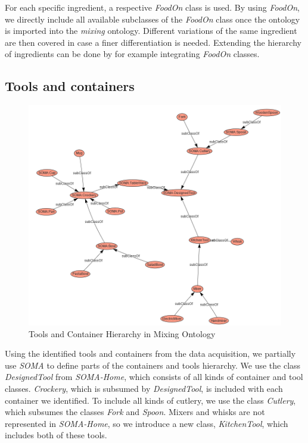 For each specific ingredient, a respective \textit{FoodOn}\cite{dooley2018foodon} class is used. By using \textit{FoodOn}, we directly include all available subclasses of the 
\textit{FoodOn} class once the ontology is imported into the \textit{mixing} ontology.
Different variations of the same ingredient are then covered in case a finer differentiation is needed. 
Extending the hierarchy of ingredients can be done by for example integrating \textit{FoodOn} classes.  

\subsection{Tools and containers}
\label{sec:toolsandcontainers}

\begin{figure}[H]
    \includegraphics[scale=0.45]{Graphics/classHierarchy/tools_hierarchy.png}
    \centering
    \caption{Tools and Container Hierarchy in Mixing Ontology}
\end{figure}

Using the identified tools and containers from the data acquisition, we partially use \textit{SOMA} \cite{soma} to define parts of the containers and tools hierarchy.
We use the class \textit{DesignedTool} from \textit{SOMA-Home}, which consists of all kinds of container and tool classes. 
\textit{Crockery}, which is subsumed by \textit{DesignedTool}, is included with each container we identified. 
To include all kinds of cutlery, we use the class \textit{Cutlery}, which subsumes the classes \textit{Fork} and \textit{Spoon}. 
Mixers and whisks are not represented in \textit{SOMA-Home}, so we introduce a new class, \textit{KitchenTool}, which includes both of these tools.

